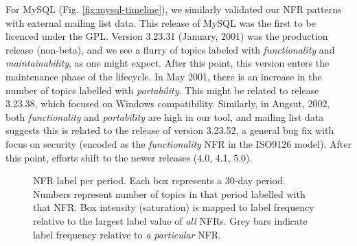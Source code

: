 \documentclass[]{sig-alternate}
\begin{document}
For MySQL (Fig. \ref{fig:mysql-timeline}), we similarly validated our NFR patterns with external mailing list data. This release of MySQL was the first to be licenced under the GPL. Version 3.23.31 (January, 2001) was the production release (non-beta), and we see a flurry of topics labeled with \emph{functionality} and \emph{maintainability}, as one might expect. After this point, this version enters the maintenance phase of the lifecycle. In May 2001, there is an increase in the number of topics labelled with \emph{portability}. This might be related to release 3.23.38, which focused on Windows compatibility. Similarly, in Augsut, 2002, both \emph{functionality} and \emph{portability} are high in our tool, and mailing list data suggests this is related to the release of version 3.23.52, a general bug fix with focus on security (encoded as the \emph{functionality} NFR in the ISO9126 model). After this point, efforts shift to the newer releases (4.0, 4.1, 5.0). 

\begin{figure}[ht]
\centering
{}           
                                             
\caption[]{NFR label per period. Each box represents a 30-day period. Numbers represent number of topics in that period labelled with that NFR. Box intensity (saturation) is mapped to label frequency relative to the largest label value of \emph{all} NFRs. Grey bars indicate label frequency relative to \emph{a particular} NFR.
}
\label{fig:timelines}
\end{figure}
\end{document}
